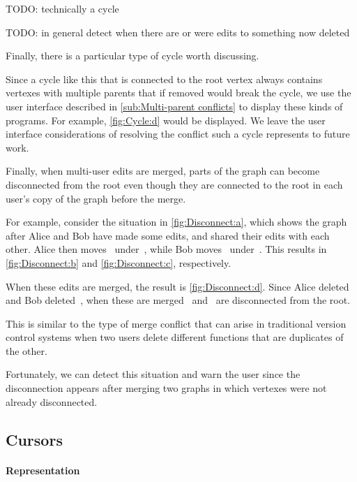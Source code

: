 \figureDisconnect{}

TODO: technically a cycle

TODO: in general detect when there are or were edits to something now deleted


Finally, there is a particular type of cycle worth discussing.

Since a cycle like this that is connected to the root vertex always
contains vertexes with multiple parents that if removed would break the cycle,
we use the user interface described in \autoref{sub:Multi-parent conflicts}
to display these kinds of programs.
For example, \autoref{fig:Cycle:d} would be displayed.
We leave the user interface considerations of resolving the conflict such a
cycle represents to future work.

Finally, when multi-user edits are merged,
parts of the graph can become disconnected from the root
even though they are connected to the root in each user's
copy of the graph before the merge.

For example, consider the situation in \autoref{fig:Disconnect:a},
which shows the graph after Alice and Bob have made some edits,
and shared their edits with each other.
Alice then moves~\vMultiCycleTimes{} under~\vSimpleTimes{},
while Bob moves~\vSimpleTimes{} under~\vMultiCycleTimes{}.
This results in \autoref{fig:Disconnect:b} and \autoref{fig:Disconnect:c}, respectively.

When these edits are merged, the result is \autoref{fig:Disconnect:d}.
Since Alice deleted~\eNestedPartsBob{}
and Bob deleted~\eMultiCycleAliceTimes{},
when these are merged~\vMultiCycleTimes{} and~\vSimpleTimes{}
are disconnected from the root.

This is similar to the type of merge conflict
that can arise in traditional version control systems
when two users delete different functions that
are duplicates of the other.

Fortunately, we can detect this situation and warn the user
since the disconnection appears after merging two graphs
in which vertexes were not already disconnected.

\subsection{Cursors}%
\label{sub:Cursors}

\paragraph{Representation}

